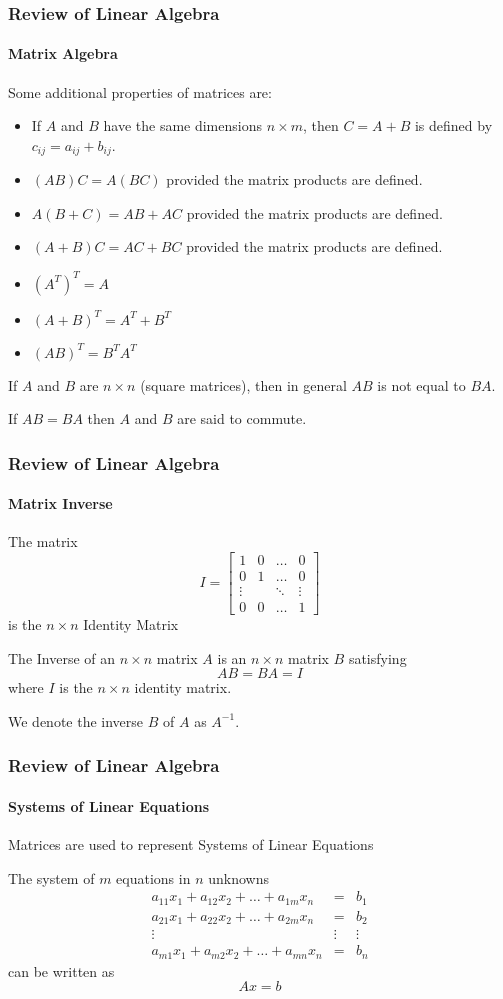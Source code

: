\begin{frame}
\frametitle{Review of Linear Algebra}
\framesubtitle{Matrix Algebra}
Some additional properties of matrices are:

\begin{itemize}
\item
If $A$ and $B$ have the same dimensions $n\times m$, then $C=A+B$ is defined by
$c_{ij} = a_{ij}+b_{ij}$.
\item
$(AB)C = A(BC)$ provided the matrix products are defined.
\item
$A(B+C) = AB + AC$ provided the matrix products are defined.
\item
$(A+B)C = AC + BC$ provided the matrix products are defined.
\item
$(A^T)^T = A$
\item
$(A+B)^T = A^T + B^T$
\item
$(AB)^T = B^TA^T$
\end{itemize}
If $A$ and $B$ are $n\times n$ {\bor (square matrices)}, then in general $AB$ is
not equal to $BA$.

If $AB =  BA$ then $A$ and $B$ are said to {\bor commute}.
\end{frame}
\begin{frame}
\frametitle{Review of Linear Algebra}
\framesubtitle{Matrix Inverse}
\begin{definition}
The matrix
$$
I = \left[\begin{array}{cccc}
1 & 0 & \dots & 0 \\
0 & 1 & \dots & 0 \\
\vdots &  & \ddots & \vdots \\
0 & 0 & \dots & 1
\end{array}\right]
$$
is the $n\times n$ {\bor Identity Matrix}
\end{definition}

\begin{definition}
The {\bor Inverse} of an $n\times n$ matrix $A$ is an $n\times n$ matrix $B$ satisfying
$$
AB=BA = I
$$
where $I$ is the $n\times n$ identity matrix.

We denote the inverse $B$ of $A$ as $A^{-1}$.
\end{definition}
\end{frame}
\begin{frame}
\frametitle{Review of Linear Algebra}
\framesubtitle{Systems of Linear Equations}
Matrices are used to represent {\bor Systems of Linear Equations}
\begin{examp}
The system of $m$ equations in $n$ unknowns
\begin{eqnarray*}
a_{11}x_1 + a_{12}x_2 + \dots  + a_{1m}x_n &=& b_1 \\
a_{21}x_1 + a_{22}x_2 + \dots  + a_{2m}x_n &=& b_2 \\
\vdots &\vdots& \vdots \\
a_{m1}x_1 + a_{m2}x_2 + \dots  + a_{mn}x_n &=& b_n
\end{eqnarray*}
can be written as
$$
Ax = b
$$
\end{examp}
\end{frame}
